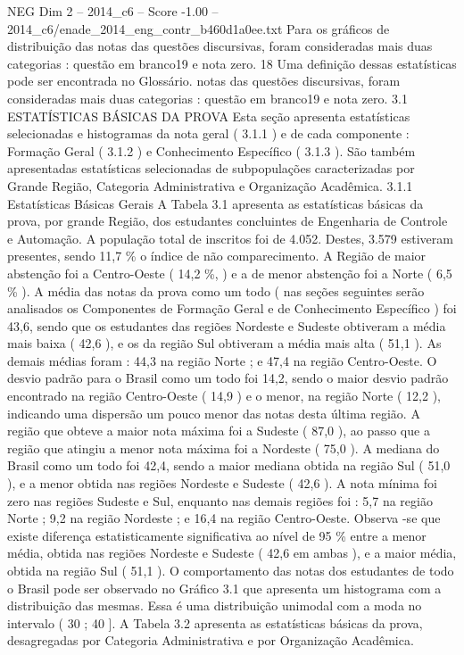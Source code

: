 \begin{textsample}{NEG Dim 2 – 2014\_c6 – Score -1.00 – 2014\_c6/enade\_2014\_eng\_contr\_b460d1a0ee.txt}
Para os gráficos de distribuição das notas das questões discursivas, foram consideradas mais duas categorias : questão em branco19 e nota zero. 18 Uma definição dessas estatísticas pode ser encontrada no Glossário. notas das questões discursivas, foram consideradas mais duas categorias : questão em branco19 e nota zero. 3.1 ESTATÍSTICAS BÁSICAS DA PROVA Esta seção apresenta estatísticas selecionadas e histogramas da nota geral ( 3.1.1 ) e de cada componente : Formação Geral ( 3.1.2 ) e Conhecimento Específico ( 3.1.3 ).
São também apresentadas estatísticas selecionadas de subpopulações caracterizadas por Grande Região, Categoria Administrativa e Organização Acadêmica. 3.1.1 Estatísticas Básicas Gerais A Tabela 3.1 apresenta as estatísticas básicas da prova, por grande Região, dos estudantes concluintes de Engenharia de Controle e Automação.
A população total de inscritos foi de 4.052.
Destes, 3.579 estiveram presentes, sendo 11,7 \% o índice de não comparecimento.
A Região de maior abstenção foi a Centro-Oeste ( 14,2 \%, ) e a de menor abstenção foi a Norte ( 6,5 \% ).
A média das notas da prova como um todo ( nas seções seguintes serão analisados os Componentes de Formação Geral e de Conhecimento Específico ) foi 43,6, sendo que os estudantes das regiões Nordeste e Sudeste obtiveram a média mais baixa ( 42,6 ), e os da região Sul obtiveram a média mais alta ( 51,1 ).
As demais médias foram : 44,3 na região Norte ; e 47,4 na região Centro-Oeste.
O desvio padrão para o Brasil como um todo foi 14,2, sendo o maior desvio padrão encontrado na região Centro-Oeste ( 14,9 ) e o menor, na região Norte ( 12,2 ), indicando uma dispersão um pouco menor das notas desta última região.
A região que obteve a maior nota máxima foi a Sudeste ( 87,0 ), ao passo que a região que atingiu a menor nota máxima foi a Nordeste ( 75,0 ).
A mediana do Brasil como um todo foi 42,4, sendo a maior mediana obtida na região Sul ( 51,0 ), e a menor obtida nas regiões Nordeste e Sudeste ( 42,6 ).
A nota mínima foi zero nas regiões Sudeste e Sul, enquanto nas demais regiões foi : 5,7 na região Norte ; 9,2 na região Nordeste ; e 16,4 na região Centro-Oeste.
Observa -se que existe diferença estatisticamente significativa ao nível de 95 \% entre a menor média, obtida nas regiões Nordeste e Sudeste ( 42,6 em ambas ), e a maior média, obtida na região Sul ( 51,1 ).
O comportamento das notas dos estudantes de todo o Brasil pode ser observado no Gráfico 3.1 que apresenta um histograma com a distribuição das mesmas.
Essa é uma distribuição unimodal com a moda no intervalo ( 30 ; 40 ].
A Tabela 3.2 apresenta as estatísticas básicas da prova, desagregadas por Categoria Administrativa e por Organização Acadêmica.

\end{textsample}
